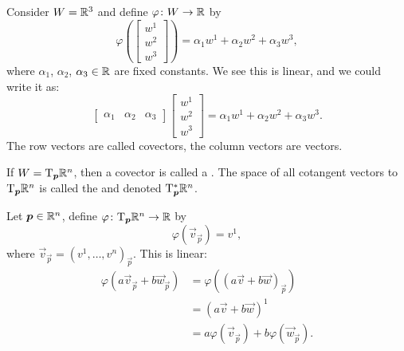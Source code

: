 \begin{example}
  Consider $W=\mathbb{R}^{3}$ and define $\varphi\colon W\to\mathbb{R}$ by
  \begin{equation}
\varphi\left(\begin{bmatrix}w^{1}\\ w^{2}\\ w^{3}
\end{bmatrix}\right) = \alpha_{1}w^{1} + \alpha_{2}w^{2} + \alpha_{3}w^{3},
  \end{equation}
where $\alpha_{1}$, $\alpha_{2}$, $\alpha_{3}\in\mathbb{R}$ are fixed
constants. We see this is linear, and we could write it as:
\begin{equation}
\begin{bmatrix}\alpha_{1} & \alpha_{2} & \alpha_{3}
\end{bmatrix}\begin{bmatrix}w^{1}\\ w^{2}\\ w^{3}
\end{bmatrix} = \alpha_{1}w^{1} + \alpha_{2}w^{2} + \alpha_{3}w^{3}.
\end{equation}
The row vectors are called covectors, the column vectors are vectors.
\end{example}

\begin{definition}
If $W=\mathrm{T}_{\boldsymbol{p}}\mathbb{R}^{n}$, then a covector is called a
. The space of all cotangent vectors to
$\mathrm{T}_{\boldsymbol{p}}\mathbb{R}^{n}$ is called the 
and denoted $\mathrm{T}^{*}_{\boldsymbol{p}}\mathbb{R}^{n}$.
\end{definition}

\begin{example}
Let $\boldsymbol{p}\in\mathbb{R}^{n}$, define $\varphi\colon\mathrm{T}_{\boldsymbol{p}}\mathbb{R}^{n}\to\mathbb{R}$ by
  \begin{equation}
\varphi(\vec{v}_{\vec{p}}) = v^{1},
  \end{equation}
  where $\vec{v}_{\vec{p}} = (v^{1},\dots,v^{n})_{\vec{p}}$. This is
  linear:
  \begin{subequations}
    \begin{align}
\varphi(a\vec{v}_{\vec{p}} + b\vec{w}_{\vec{p}})
&= \varphi\left((a\vec{v}+b\vec{w})_{\vec{p}}\right)\\
&= (a\vec{v}+b\vec{w})^{1}\\
&= a\varphi(\vec{v}_{\vec{p}}) + b\varphi(\vec{w}_{\vec{p}}).
    \end{align}
  \end{subequations}
\end{example}

